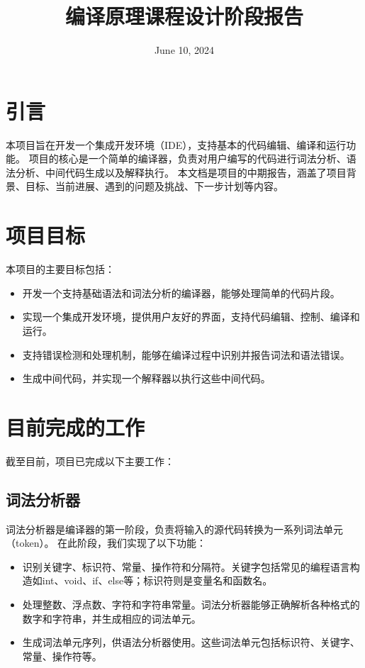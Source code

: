 \documentclass[12pt]{article}
\title{\textbf{编译原理课程设计阶段报告}}
\date{June 10, 2024}
\begin{document}
\maketitle

\section{引言}
\quad\quad
本项目旨在开发一个集成开发环境（IDE），支持基本的代码编辑、编译和运行功能。
项目的核心是一个简单的编译器，负责对用户编写的代码进行词法分析、语法分析、中间代码生成以及解释执行。
本文档是项目的中期报告，涵盖了项目背景、目标、当前进展、遇到的问题及挑战、下一步计划等内容。

\section{项目目标}
\quad\quad
本项目的主要目标包括：
\begin{itemize}
    \item 开发一个支持基础语法和词法分析的编译器，能够处理简单的代码片段。
    \item 实现一个集成开发环境，提供用户友好的界面，支持代码编辑、控制、编译和运行。
    \item 支持错误检测和处理机制，能够在编译过程中识别并报告词法和语法错误。
    \item 生成中间代码，并实现一个解释器以执行这些中间代码。
\end{itemize}

\section{目前完成的工作}
\quad\quad 截至目前，项目已完成以下主要工作：

\subsection{词法分析器}
\quad\quad
词法分析器是编译器的第一阶段，负责将输入的源代码转换为一系列词法单元（token）。
在此阶段，我们实现了以下功能：
\begin{itemize}
    \item 识别关键字、标识符、常量、操作符和分隔符。关键字包括常见的编程语言构造如int、void、if、else等；标识符则是变量名和函数名。
    \item 处理整数、浮点数、字符和字符串常量。词法分析器能够正确解析各种格式的数字和字符串，并生成相应的词法单元。
    \item 生成词法单元序列，供语法分析器使用。这些词法单元包括标识符、关键字、常量、操作符等。
\end{itemize}
\end{document}
